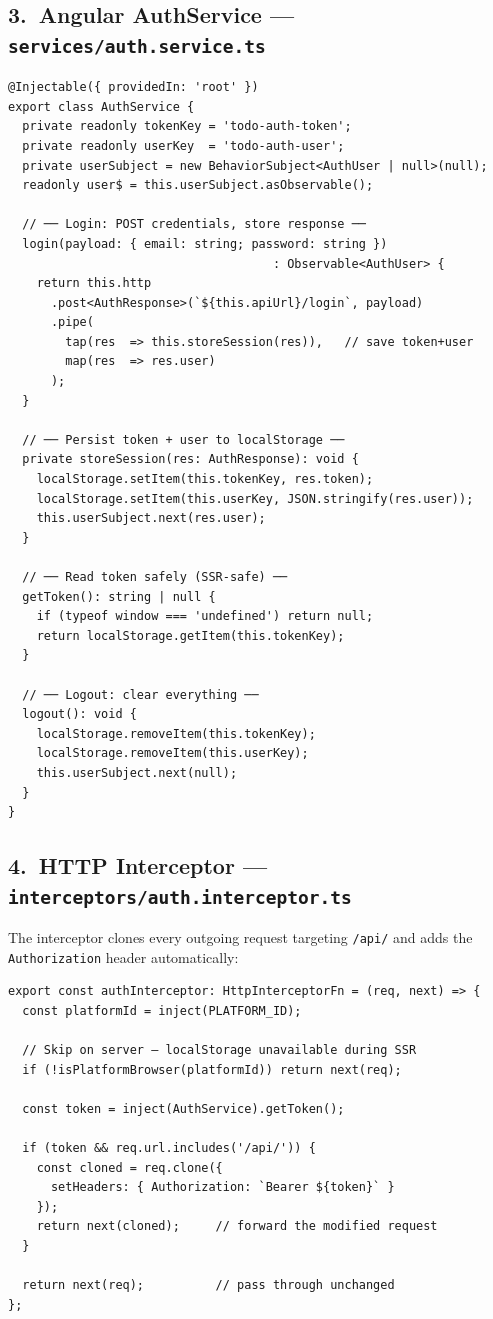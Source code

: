 \documentclass[11pt,a4paper]{article}
\begin{document}
\subsection*{3.\ Angular AuthService — \texttt{services/auth.service.ts}}

\begin{lstlisting}[style=ts, language={[Sharp]C}]
@Injectable({ providedIn: 'root' })
export class AuthService {
  private readonly tokenKey = 'todo-auth-token';
  private readonly userKey  = 'todo-auth-user';
  private userSubject = new BehaviorSubject<AuthUser | null>(null);
  readonly user$ = this.userSubject.asObservable();

  // ── Login: POST credentials, store response ──
  login(payload: { email: string; password: string })
                                     : Observable<AuthUser> {
    return this.http
      .post<AuthResponse>(`${this.apiUrl}/login`, payload)
      .pipe(
        tap(res  => this.storeSession(res)),   // save token+user
        map(res  => res.user)
      );
  }

  // ── Persist token + user to localStorage ──
  private storeSession(res: AuthResponse): void {
    localStorage.setItem(this.tokenKey, res.token);
    localStorage.setItem(this.userKey, JSON.stringify(res.user));
    this.userSubject.next(res.user);
  }

  // ── Read token safely (SSR-safe) ──
  getToken(): string | null {
    if (typeof window === 'undefined') return null;
    return localStorage.getItem(this.tokenKey);
  }

  // ── Logout: clear everything ──
  logout(): void {
    localStorage.removeItem(this.tokenKey);
    localStorage.removeItem(this.userKey);
    this.userSubject.next(null);
  }
}
\end{lstlisting}

\subsection*{4.\ HTTP Interceptor — \texttt{interceptors/auth.interceptor.ts}}

The interceptor clones every outgoing request targeting \texttt{/api/} and adds the
\texttt{Authorization} header automatically:

\begin{lstlisting}[style=ts, language={[Sharp]C}]
export const authInterceptor: HttpInterceptorFn = (req, next) => {
  const platformId = inject(PLATFORM_ID);

  // Skip on server — localStorage unavailable during SSR
  if (!isPlatformBrowser(platformId)) return next(req);

  const token = inject(AuthService).getToken();

  if (token && req.url.includes('/api/')) {
    const cloned = req.clone({
      setHeaders: { Authorization: `Bearer ${token}` }
    });
    return next(cloned);     // forward the modified request
  }

  return next(req);          // pass through unchanged
};
\end{lstlisting}
\end{document}
